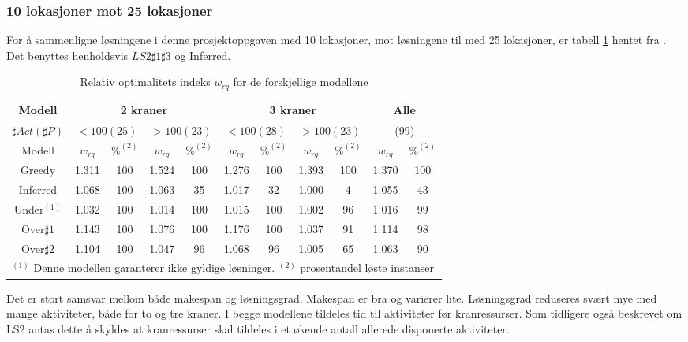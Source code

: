 \subsubsection{10 lokasjoner mot 25 lokasjoner}
For å sammenligne løsningene i denne prosjektoppgaven med 10 lokasjoner, mot løsningene til \bht med 25 lokasjoner, er tabell \ref{tab:resultaterSumTvedt} hentet fra \cite{tvedtbezem}. Det benyttes henholdsvis $LS2\sharp1\sharp3$ og Inferred.
\begin{table}[!h]
\caption{Relativ optimalitets indeks $w_{rq}$ for de forskjellige modellene}
\begin{center}
\begin{tabular}{ | c | c | c | c | c | c | c | c | c | c | c | }
\hline
\textbf{Modell} & \multicolumn{4}{|c|}{\textbf{2 kraner}} & \multicolumn{4}{|c|}{\textbf{3 kraner}} & \multicolumn{2}{|c|}{\textbf{Alle}} \\ \hline
$\sharp Act(\sharp P)$ & \multicolumn{2}{|c|}{$< 100 (25)$} & \multicolumn{2}{|c|}{$> 100 (23)$} & \multicolumn{2}{|c|}{$< 100 (28)$} & \multicolumn{2}{|c|}{$> 100 (23)$} & \multicolumn{2}{|c|}{(99)} \\ 
\hline
Modell & $w_{rq}$ & $\%^{(2)}$ & $w_{rq}$ & $\%^{(2)}$  & $w_{rq}$ & $\%^{(2)}$ & $w_{rq}$ & $\%^{(2)}$ & $w_{rq}$ & $\%^{(2)}$ \\ \hline
Greedy & 1.311 & 100 & 1.524 & 100 & 1.276 & 100 & 1.393 & 100 & 1.370 & 100 \\
Inferred & 1.068 & 100 & 1.063 & 35 & 1.017 & 32 & 1.000 & 4 & 1.055 & 43 \\
Under$^{(1)}$ & 1.032 & 100 & 1.014 & 100 & 1.015 & 100 & 1.002 & 96 & 1.016 & 99 \\
Over$\sharp 1$ & 1.143 & 100 & 1.076 & 100 & 1.176 & 100 & 1.037 & 91 & 1.114 & 98 \\
Over$\sharp 2$ & 1.104 & 100 & 1.047 & 96 & 1.068 & 96 & 1.005 & 65 & 1.063 & 90 \\
\hline
\multicolumn{11}{l}{\begin{minipage}{6in}$^{(1)}$ Denne modellen garanterer ikke gyldige løsninger.
$^{(2)}$ prosentandel løste instanser \end{minipage}}
\end{tabular}
\end{center}
\label{tab:resultaterSumTvedt}
\end{table}
Det er stort samsvar mellom både makespan og løsningsgrad. Makespan er bra og varierer lite. Løsningsgrad reduseres svært mye med mange aktiviteter, både for to og tre kraner. I begge modellene tildeles tid til aktiviteter før kranressurser. Som tidligere også beskrevet om LS2 antas dette å skyldes at kranressurser skal tildeles i et økende antall allerede disponerte aktiviteter.